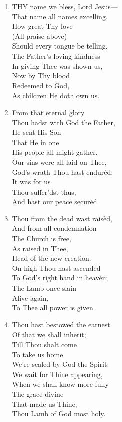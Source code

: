 \documentclass[11pt,a4paper]{article}
\begin{document}
\begin{enumerate}
    \item THY name we bless, Lord Jesus--- \\
        That name all names excelling. \\
            How great Thy love \\
            (All praise above) \\
        Should every tongue be telling. \\
        The Father's loving kindness \\
        In giving Thee was shown us, \\
            Now by Thy blood \\
            Redeemed to God, \\
        As children He doth own us.

    \item From that eternal glory \\
        Thou hadst with God the Father, \\
            He sent His Son \\
            That He in one \\
        His people all might gather. \\
        Our sins were all laid on Thee, \\
        God's wrath Thou hast endur\`ed; \\
            It was for us \\
            Thou suffer'dst thus, \\
        And hast our peace secur\`ed.

    \item Thou from the dead wast rais\`ed, \\
        And from all condemnation \\
            The Church is free, \\
            As raised in Thee, \\
        Head of the new creation. \\
        On high Thou hast ascended \\
        To God's right hand in heav\`en; \\
            The Lamb once slain \\
            Alive again, \\
        To Thee all power is given.

    \item Thou hast bestowed the earnest \\
        Of that we shall inherit; \\
            Till Thou shalt come \\
            To take us home \\
        We're sealed by God the Spirit. \\
        We wait for Thine appearing, \\
        When we shall know more fully \\
            The grace divine \\
            That made us Thine, \\
        Thou Lamb of God most holy.


\end{enumerate}
\end{document}
